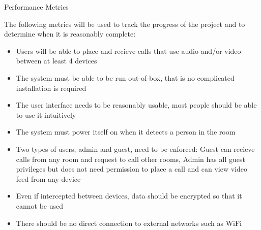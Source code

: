 \documentclass{article}
\begin{document}
Performance Metrics

\vspace{1cm}

The following metrics will be used to track the progress of the project and to determine when it is reasonably complete:

\begin{itemize}

\item Users will be able to place and recieve calls that use audio and/or video between at least 4 devices
\item The system must be able to be run out-of-box, that is no complicated installation is required
\item The user interface needs to be reasonably usable, most people should be able to use it intuitively
\item The system must power itself on when it detects a person in the room
\item Two types of users, admin and guest, need to be enforced: Guest can recieve calls from any room and request to call other rooms, Admin has all guest privileges but does not need permission to place a call and can view video feed from any device 
\item Even if intercepted between devices, data should be encrypted so that it cannot be used
\item There should be no direct connection to external networks such as WiFi


\end{itemize}
\end{document}
